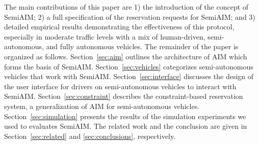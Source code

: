 The main contributions of this paper are 1) the introduction of the
concept of SemiAIM; 2) a full specification of the reservation
requests for SemiAIM; and 3) detailed empirical results demonstrating
the effectiveness of this protocol, especially in moderate traffic
levels with a mix of human-driven, semi-autonomous, and fully
autonomous vehicles.  The remainder of the paper is organized as
follows.  Section~\ref{sec:aim} outlines the architecture of AIM which
forms the basis of SemiAIM.  Section~\ref{sec:vehicles} categorizes
semi-autonomous vehicles that work with SemiAIM.
Section~\ref{sec:interface} discusses the design of the user interface
for drivers on semi-autonomous vehicles to interact with SemiAIM.
Section~\ref{sec:constraint} describes the constraint-based
reservation system, a generalization of AIM for semi-autonomous
vehicles.  Section~\ref{sec:simulation} presents the results of the
simulation experiments we used to evaluates SemiAIM.  The related work
and the conclusion are given in Section~\ref{sec:related} and
\ref{sec:conclusions}, respectively.




